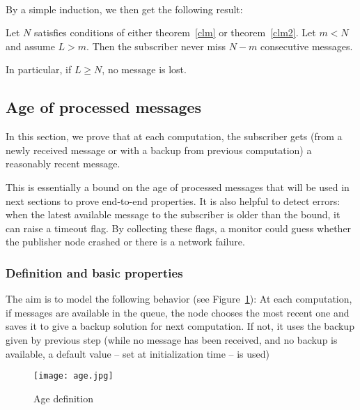 \paragraph{ }By a simple induction, we then get the following result:

\begin{thm} 
Let $N$ satisfies conditions of either theorem~\ref{clm} or theorem~\ref{clm2}. Let $m < N$ and assume $L > m$. Then the subscriber never miss $N - m$ consecutive messages.

In particular, if $L \geq N$, no message is lost.
\end{thm} 

\subsection{Age of processed messages}

In this section, we prove that at each computation, the subscriber gets (from a newly received message or with a backup from previous computation) a reasonably recent message.

This is essentially a bound on the age of processed messages that will be used in next sections to prove end-to-end properties. It is also helpful to detect errors: when the latest available message to the subscriber is older than the bound, it can raise a timeout flag. By collecting these flags, a monitor could guess whether the publisher node crashed or there is a network failure.

\subsubsection{Definition and basic properties}

The aim is to model the following behavior (see Figure~\ref{age}):
 At each computation, if messages are available in the queue, the node chooses the most recent one and saves it to give a backup solution for next computation. 
If not, it uses the backup given by previous step (while no message has been received, and no backup is available, a default value -- set at initialization time -- is used)

\begin{figure}[h]
\begin{center}
\texttt{[image: age.jpg]}
\caption{Age definition}\label{age}
\end{center}
\end{figure}


